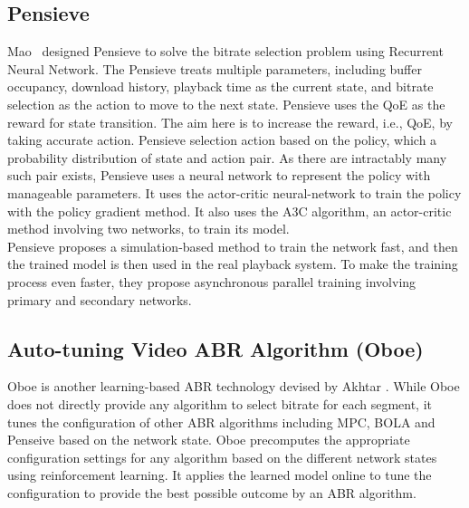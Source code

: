 
\subsection{Pensieve}
Mao \etal\ designed Pensieve\cite{mao2017neural} to solve the bitrate selection problem using Recurrent Neural Network. The Pensieve treats multiple parameters, including buffer occupancy, download history, playback time as the current state, and bitrate selection as the action to move to the next state. Pensieve uses the QoE as the reward for state transition. The aim here is to increase the reward, i.e., QoE, by taking accurate action. Pensieve selection action based on the policy, which a probability distribution of state and action pair. As there are intractably many such pair exists, Pensieve uses a neural network to represent the policy with manageable parameters. It uses the actor-critic neural-network to train the policy with the policy gradient method\cite{sutton1999policy}. It also uses the A3C\cite{10.5555/3045390.3045594} algorithm, an actor-critic method involving two networks, to train its model.\\
Pensieve proposes a simulation-based method to train the network fast, and then the trained model is then used in the real playback system. To make the training process even faster, they propose asynchronous parallel training involving primary and secondary networks.

\subsection{Auto-tuning Video ABR Algorithm (Oboe)}
Oboe\cite{Akhtar2018} is another learning-based ABR technology devised by Akhtar \etal. While Oboe does not directly provide any algorithm to select bitrate for each segment, it tunes the configuration of other ABR algorithms including MPC\cite{yin2015control,10.1145/2670518.2673877}, BOLA\cite{Spiteri2016} and Penseive\cite{mao2017neural} based on the network state. Oboe precomputes the appropriate configuration settings for any algorithm based on the different network states using reinforcement learning. It applies the learned model online to tune the configuration to provide the best possible outcome by an ABR algorithm.


